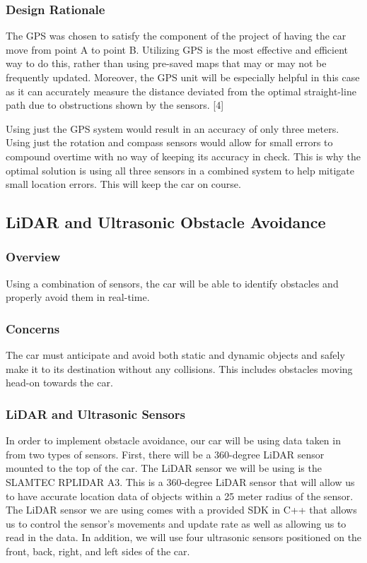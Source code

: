 \documentclass[onecolumn, draftclsnofoot, 10pt, compsoc]{IEEEtran}
\begin{document}
\subsubsection{Design Rationale}
The GPS was chosen to satisfy the component of the project of having the car move from point A to point B. Utilizing GPS is the most effective and efficient way to do this, rather than using pre-saved maps that may or may not be frequently updated. Moreover, the GPS unit will be especially helpful in this case as it can accurately measure the distance deviated from the optimal straight-line path due to obstructions shown by the sensors. [4]

Using just the GPS system would result in an accuracy of only three meters. Using just the rotation and compass sensors would allow for small errors to compound overtime with no way of keeping its accuracy in check. This is why the optimal solution is using all three sensors in a combined system to help mitigate small location errors. This will keep the car on course. 


\subsection{LiDAR and Ultrasonic Obstacle Avoidance}

\subsubsection{Overview}
 Using a combination of sensors, the car will be able to identify obstacles and properly avoid them in real-time.

\subsubsection{Concerns}
The car must anticipate and avoid both static and dynamic objects and safely make it to its destination without any collisions. This includes obstacles moving head-on towards the car.

\subsubsection{LiDAR and Ultrasonic Sensors}
In order to implement obstacle avoidance, our car will be using data taken in from two types of sensors. First, there will be a 360-degree LiDAR sensor mounted to the top of the car. The LiDAR sensor we will be using is the SLAMTEC RPLIDAR A3. This is a 360-degree LiDAR sensor that will allow us to have accurate location data of objects within a 25 meter radius of the sensor. The LiDAR sensor we are using comes with a provided SDK in C++ that allows us to control the sensor’s movements and update rate as well as allowing us to read in the data. In addition, we will use four ultrasonic sensors positioned on the front, back, right, and left sides of the car. 
\end{document}
